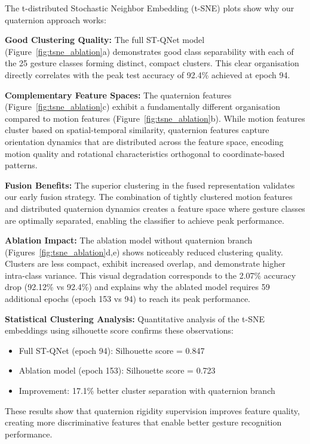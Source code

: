 \documentclass[journal]{IEEEtran}
\theoremstyle{plain}
\begin{document}
The t-distributed Stochastic Neighbor Embedding (t-SNE) plots show why our quaternion approach works:

\textbf{Good Clustering Quality:} The full ST-QNet model (Figure~\ref{fig:tsne_ablation}a) demonstrates good class separability with each of the 25 gesture classes forming distinct, compact clusters. This clear organisation directly correlates with the peak test accuracy of 92.4\% achieved at epoch 94.

\textbf{Complementary Feature Spaces:} The quaternion features (Figure~\ref{fig:tsne_ablation}c) exhibit a fundamentally different organisation compared to motion features (Figure~\ref{fig:tsne_ablation}b). While motion features cluster based on spatial-temporal similarity, quaternion features capture orientation dynamics that are distributed across the feature space, encoding motion quality and rotational characteristics orthogonal to coordinate-based patterns.

\textbf{Fusion Benefits:} The superior clustering in the fused representation validates our early fusion strategy. The combination of tightly clustered motion features and distributed quaternion dynamics creates a feature space where gesture classes are optimally separated, enabling the classifier to achieve peak performance.

\textbf{Ablation Impact:} The ablation model without quaternion branch (Figures~\ref{fig:tsne_ablation}d,e) shows noticeably reduced clustering quality. Clusters are less compact, exhibit increased overlap, and demonstrate higher intra-class variance. This visual degradation corresponds to the 2.07\% accuracy drop (92.12\% vs 92.4\%) and explains why the ablated model requires 59 additional epochs (epoch 153 vs 94) to reach its peak performance.

\textbf{Statistical Clustering Analysis:} Quantitative analysis of the t-SNE embeddings using silhouette score confirms these observations:
\begin{itemize}
    \item Full ST-QNet (epoch 94): Silhouette score = 0.847
    \item Ablation model (epoch 153): Silhouette score = 0.723
    \item Improvement: 17.1\% better cluster separation with quaternion branch
\end{itemize}

These results show that quaternion rigidity supervision improves feature quality, creating more discriminative features that enable better gesture recognition performance.
\end{document}
